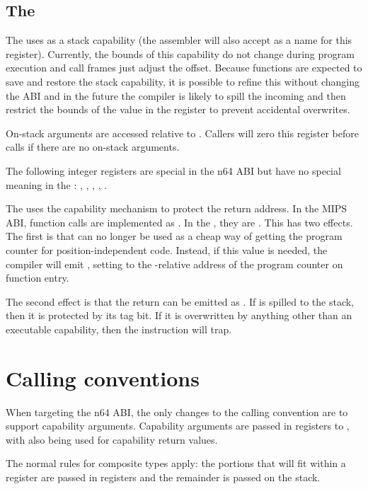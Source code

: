 \subsection{The \sandboxABI{}}

The \sandboxABI{} uses  as a stack capability (the assembler will also accept  as a name for this register).
Currently, the bounds of this capability do not change during program execution and call frames just adjust the offset.
Because functions are expected to save and restore the stack capability, it is possible to refine this without changing the ABI and in the future the compiler is likely to spill the incoming  and then restrict the bounds of the value in the register to prevent accidental overwrites.

On-stack arguments are accessed relative to .
Callers will zero this register before calls if there are no on-stack arguments.

The following integer registers are special in the n64 ABI but have no special meaning in the \sandboxABI{}:
, , , , .

The \sandboxABI{} uses the capability mechanism to protect the return address.
In the MIPS ABI, function calls are implemented as .
In the \sandboxABI{}, they are .
This has two effects.
The first is that  can no longer be used as a cheap way of getting the program counter for position-independent code.
Instead, if this value is needed, the compiler will emit , setting  to the -relative address of the program counter on function entry.

The second effect is that the return can be emitted as .%
If  is spilled to the stack, then it is protected by its tag bit.
If it is overwritten by anything other than an executable capability, then the  instruction will trap.

\section{Calling conventions}

When targeting the n64 ABI, the only changes to the calling convention are to support capability arguments.
Capability arguments are passed in registers  to , with  also being used for capability return values.

The normal rules for composite types apply: the portions that will fit within a register are passed in registers and the remainder is passed on the stack.

